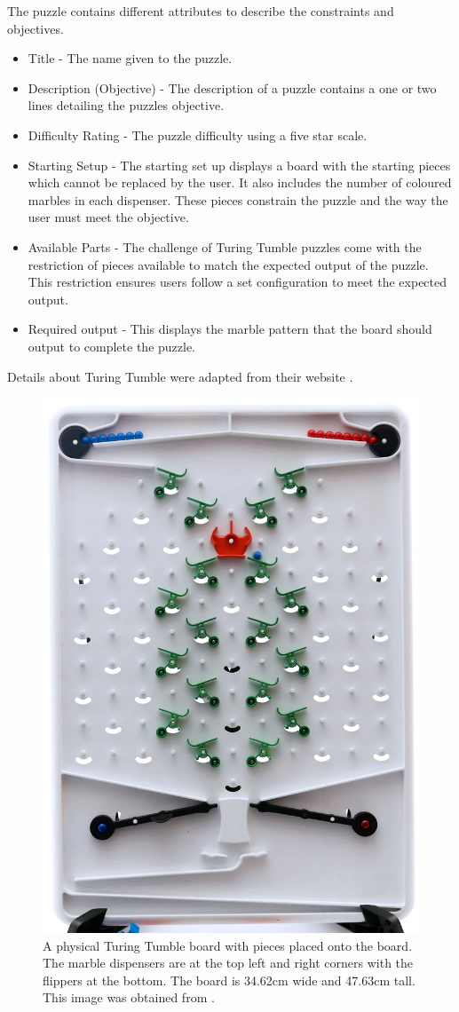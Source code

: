 \documentclass{l4proj}
\begin{document}
The puzzle contains different attributes to describe the constraints and objectives.
\begin{itemize}
    \item Title - The name given to the puzzle.
    \item Description (Objective) - The description of a puzzle contains a one or two lines detailing the puzzles objective.
    \item Difficulty Rating - The puzzle difficulty using a five star scale.
    \item Starting Setup - The starting set up displays a board with the starting pieces which cannot be replaced by the user. It also includes the number of coloured marbles in each dispenser. These pieces constrain the puzzle and the way the user must meet the objective.
    \item Available Parts - The challenge of Turing Tumble puzzles come with the restriction of pieces available to match the expected output of the puzzle. This restriction ensures users follow a set configuration to meet the expected output.
    \item Required output - This displays the marble pattern that the board should output to complete the puzzle.
\end{itemize}

Details about Turing Tumble were adapted from their website \citep{turing_tumble_site}.

\begin{figure}
    \centering
    \includegraphics[width=0.6\linewidth]{images/turingTumbleBoard.png}
    \caption{A physical Turing Tumble board with pieces placed onto the board. The marble dispensers are at the top left and right corners with the flippers at the bottom. The board is 34.62cm wide and 47.63cm tall. This image was obtained from \cite{turing_tumble_picture}.}
    \label{fig:ttboard}
\end{figure}
\end{document}
